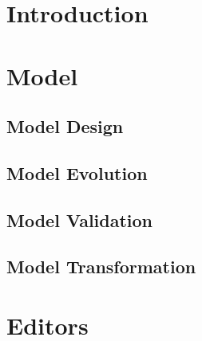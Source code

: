 \documentclass{template/openetcs_article}
\begin{document}
\section*{Introduction}

\section{Model}
\label{sec:model}

\subsection{Model Design}
\label{sec:mdesign}

\subsection{Model Evolution}
\label{sec:mevolution}

\subsection{Model Validation}
\label{sec:mvalidation}

\subsection{Model Transformation}
\label{sec:mvalidation}

\section{Editors}
\label{sec:editors}

\end{document}
